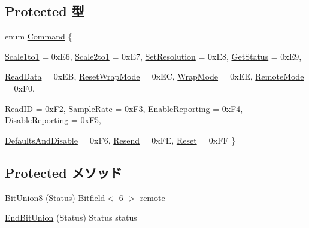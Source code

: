 \subsection*{Protected 型}
\begin{DoxyCompactItemize}
\item 
enum \hyperlink{classX86ISA_1_1PS2Mouse_a2afce0a47a93eee73a314d53e4890153}{Command} \{ \par
\hyperlink{classX86ISA_1_1PS2Mouse_a2afce0a47a93eee73a314d53e4890153abd085e6a01d495102699846faf8323e6}{Scale1to1} =  0xE6, 
\hyperlink{classX86ISA_1_1PS2Mouse_a2afce0a47a93eee73a314d53e4890153a784b9163a7c176b9bb5c7ec2968cdfbd}{Scale2to1} =  0xE7, 
\hyperlink{classX86ISA_1_1PS2Mouse_a2afce0a47a93eee73a314d53e4890153a1fa45c553056ac473f7d280e9f8b58e6}{SetResolution} =  0xE8, 
\hyperlink{classX86ISA_1_1PS2Mouse_a2afce0a47a93eee73a314d53e4890153a050d7c8b46c7296173d8c6f565695cb0}{GetStatus} =  0xE9, 
\par
\hyperlink{classX86ISA_1_1PS2Mouse_a2afce0a47a93eee73a314d53e4890153adf6fcea7ad456e7310f3043a88e8cc37}{ReadData} =  0xEB, 
\hyperlink{classX86ISA_1_1PS2Mouse_a2afce0a47a93eee73a314d53e4890153a620df770460f5ddaa328b10dc735eda4}{ResetWrapMode} =  0xEC, 
\hyperlink{classX86ISA_1_1PS2Mouse_a2afce0a47a93eee73a314d53e4890153a3685cf23fb69875be18aa25a9cdb3c51}{WrapMode} =  0xEE, 
\hyperlink{classX86ISA_1_1PS2Mouse_a2afce0a47a93eee73a314d53e4890153ace41457597e88d0ef23effe601406df8}{RemoteMode} =  0xF0, 
\par
\hyperlink{classX86ISA_1_1PS2Mouse_a2afce0a47a93eee73a314d53e4890153af2dc99b912a4b0eda5322902128c8695}{ReadID} =  0xF2, 
\hyperlink{classX86ISA_1_1PS2Mouse_a2afce0a47a93eee73a314d53e4890153a2813b71971fb08700b07ab786fa5c2e3}{SampleRate} =  0xF3, 
\hyperlink{classX86ISA_1_1PS2Mouse_a2afce0a47a93eee73a314d53e4890153a30e97a34a968f87aaf32a1615ec1e5bb}{EnableReporting} =  0xF4, 
\hyperlink{classX86ISA_1_1PS2Mouse_a2afce0a47a93eee73a314d53e4890153a823a797dce4051d9344dcf4dc3906384}{DisableReporting} =  0xF5, 
\par
\hyperlink{classX86ISA_1_1PS2Mouse_a2afce0a47a93eee73a314d53e4890153a98019ed7a55373ba59012493c7b79851}{DefaultsAndDisable} =  0xF6, 
\hyperlink{classX86ISA_1_1PS2Mouse_a2afce0a47a93eee73a314d53e4890153a09faf5069efc511c8f45196604b91ee9}{Resend} =  0xFE, 
\hyperlink{classX86ISA_1_1PS2Mouse_a2afce0a47a93eee73a314d53e4890153a92793663441ced378f4676b8a6524385}{Reset} =  0xFF
 \}
\end{DoxyCompactItemize}
\subsection*{Protected メソッド}
\begin{DoxyCompactItemize}
\item 
\hyperlink{classX86ISA_1_1PS2Mouse_ad5a62dd93ada43b5048b0d9ddfc8b076}{BitUnion8} (Status) Bitfield$<$ 6 $>$ remote
\item 
\hyperlink{classX86ISA_1_1PS2Mouse_a716a44dd9c10b22cacb46491ae3e525a}{EndBitUnion} (Status) Status status
\end{DoxyCompactItemize}
